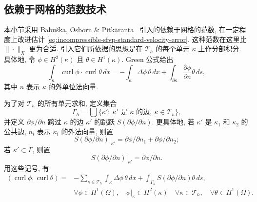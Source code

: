 \subsection{依赖于网格的范数技术}
\label{subsec:incompressible-sfvp-mesh-dependent}

本小节采用 Babuška, Osborn \& Pitkäranta~\cite{ref:babuska-osborn-pitkaranta-5}
引入的依赖于网格的范数, 在一定程度上改进估计
\eqref{eq:incompressible-sfvp-standard-velocity-error}.
这种范数在这里比 $\|\cdot\|_{\widetilde X}$ 更为合适.
引入它们所依据的思想是在 $\mathcal T_h$ 的每个单元 $\kappa$
上作分部积分. 具体地, 令 $\phi\in H^2(\kappa)$
且 $\theta\in H^1(\kappa)$. Green 公式给出
\[
\int_\kappa\operatorname{curl}\phi\cdot
\operatorname{curl}\theta\,dx
=-\int_\kappa\Delta\phi\,\theta\,dx
+\int_{\partial\kappa}\frac{\partial\phi}{\partial n}\theta\,ds,
\]
其中 $n$ 表示 $\kappa$ 的外单位法向量.

为了对 $\mathcal T_h$ 的所有单元求和, 定义集合
\[
\Gamma_h
=\bigcup\{\kappa';\ \kappa'\text{ 是 }\kappa\text{ 的边},
\ \kappa\in\mathcal T_h\},
\]
并定义 $\partial\phi/\partial n$ 跨过 $\kappa$ 的边
$\kappa'$ 的跳跃 $S(\partial\phi/\partial n)$.
更具体地, 若 $\kappa'$ 是 $\kappa_1$ 和 $\kappa_2$ 的公共边,
$n_i$ 表示 $\kappa_i$ 的外法向量, 则置
\[
S(\partial\phi/\partial n)|_{\kappa'}
=\partial\phi/\partial n_1+\partial\phi/\partial n_2;
\]
若 $\kappa'\subset\Gamma$, 则置
\[
S(\partial\phi/\partial n)|_{\kappa'}
=\partial\phi/\partial n.
\]
用这些记号, 有
\begin{equation}\label{eq:incompressible-sfvp-elementwise-green}
\begin{split}
(\operatorname{curl}\phi,\operatorname{curl}\theta)
={}&-\sum_{\kappa\in\mathcal T_h}
\int_\kappa\Delta\phi\,\theta\,dx
+\int_{\Gamma_h}S(\partial\phi/\partial n)\theta\,ds,\\
&\forall\phi\in H^1(\Omega),
\quad \phi|_\kappa\in H^2(\kappa)
\quad\forall\kappa\in\mathcal T_h,
\quad\forall\theta\in H^1(\Omega).
\end{split}
\end{equation}

